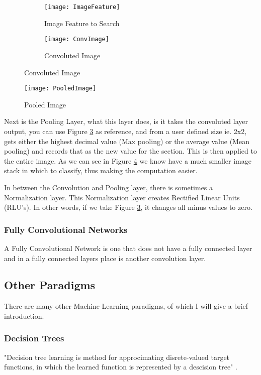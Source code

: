 \begin{figure}
      \begin{subfigure}[b]{0.4\textwidth}
          \texttt{[image: ImageFeature]}
          \caption{Image Feature to Search}
          \label{fig:feature}
      \end{subfigure}
      \begin{subfigure}[b]{0.4\textwidth}
           \texttt{[image: ConvImage]}
           \caption{Convoluted Image}
           \label{fig:convoluted}
      \end{subfigure}
\end{figure}
\begin{figure}
    \texttt{[image: PooledImage]}
    \caption{Pooled Image}
    \label{fig:pooled}
\end{figure}
Next is the Pooling Layer, what this layer does, is it takes the convoluted
layer output, you can use Figure \ref{fig:convoluted} as reference, and from a
user defined size ie. 2x2, gets either the highest decimal value (Max pooling)
or the average value (Mean pooling) and records that as the new value for the
section. This is then applied to the entire image. As we can see in Figure
\ref{fig:pooled} we know have a much smaller image stack in which to classify,
thus making the computation easier.

In between the Convolution and Pooling layer, there is sometimes a Normalization
layer. This Normalization layer creates Rectified Linear Units (RLU's). In other
words, if we take Figure \ref{fig:convoluted}, it changes all minus values to
zero.

\subsubsection{Fully Convolutional Networks}
A Fully Convolutional Network is one that does not have a fully connected layer
and in a fully connected layers place is another convolution layer.

\subsection{Other Paradigms}
There are many other Machine Learning paradigms, of which I will give a brief
introduction.

\subsubsection{Decision Trees}
"Decision tree learning is  method for approcimating disrete-valued target
functions, in which the learned function is represented by a descision tree"
\textcite{MLDT}.

